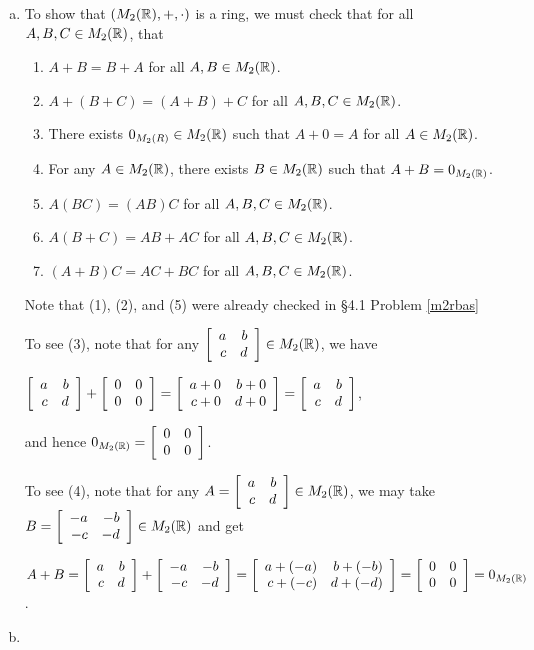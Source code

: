 \documentclass[11pt,fleqn,dvipsnames,usenames]{article}
\begin{document}
\begin{enumerate}[1.]
\solution 
\begin{enumerate}[(a)]
\item To show that $(M_{2}(\R), +, \cdot)$ is a ring, we must check that for all $A,B,C\in M_{2}(\R)$, that
\begin{enumerate}[(1)]
\item $A + B  = B + A$ for all $A,B\in M_{2}(\R)$.
\item $A + (B + C) = (A + B) + C$ for all $A,B,C \in M_{2}(\R)$.
\item There exists $0_{M_{2}(R)}\in M_{2}(\R)$ such that $A + 0 = A$ for all $A\in M_{2}(\R)$.
\item For any $A\in M_{2}(\R)$, there exists $B\in M_{2}(\R)$ such that $A + B = 0_{M_{2}(\R)}$.
\item $A(BC) = (AB)C$ for all $A,B,C \in M_{2}(\R)$.
\item $A(B+C) = AB + AC$ for all $A,B,C \in M_{2}(\R)$.
\item $(A +B)C = AC + BC$ for all $A,B,C \in M_{2}(\R)$.
\end{enumerate}
Note that (1), (2), and (5) were already checked in \S4.1 Problem \ref{m2rbas}
\vsmsp

To see (3), note that for any $\MATRIX{rr}{a & b\\c & d}\in M_{2}(\R)$, we have
\begin{center}
$\MATRIX{rr}{a & b\\c & d} + \MATRIX{rr}{0 & 0\\0 & 0} = \MATRIX{rr}{a + 0 & b + 0\\c + 0 & d + 0} = \MATRIX{rr}{a & b\\c & d}$,
\end{center}
and hence $0_{M_{2}(\R)} = \MATRIX{rr}{0 & 0\\0 & 0}$.

To see (4), note that for any $A = \MATRIX{rr}{a & b\\c & d}\in M_{2}(\R)$, we may take $B = \MATRIX{rr}{-a & -b\\-c & -d}\in M_{2}(\R)$ and get
\begin{center}
$A + B = \MATRIX{rr}{a & b\\c & d} + \MATRIX{rr}{-a & -b\\-c & -d} = \MATRIX{rr}{a + (-a) & b + (-b)\\c + (-c) & d + (-d)} = \MATRIX{rr}{0 & 0\\0 & 0} = 0_{M_{2}(\R)}$.
\end{center}
\item 
 

\end{enumerate}
\end{enumerate}
\end{document}
